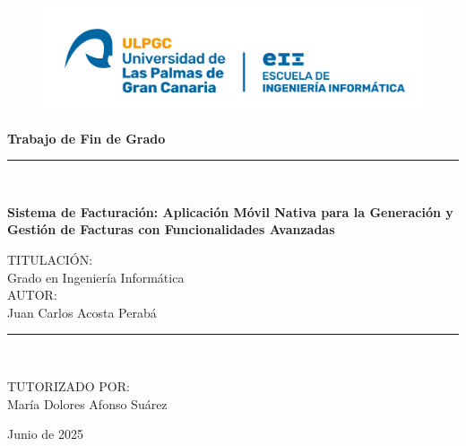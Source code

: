 \begin{titlepage}

\begin{center}

\vspace*{0.25in}
\begin{figure}[htb]
\begin{center}
\includegraphics[width=15cm]{Ilustraciones/NuevoLogoEII.png}
\end{center}
\end{figure}

\vspace*{0.25in}
\vspace*{0.25in}
\begin{Huge}
    \textbf{Trabajo de Fin de Grado} \\
\end{Huge}
\vspace*{0.5in}

\noindent\hfil\rule{17cm}{0.2mm}\hfil\\

\vspace*{0.1in}
\begin{Huge}
    \textbf{Sistema de Facturación: Aplicación Móvil Nativa para la Generación y Gestión de Facturas con Funcionalidades Avanzadas} \\
\end{Huge}
\vspace*{0.3in}
\begin{large}
TITULACIÓN: \\
Grado en Ingeniería Informática \\
\vspace*{0.1in}
AUTOR: \\
Juan Carlos Acosta Perabá \\
\end{large}
\vspace*{0.3in}
\noindent\hfil\rule{17cm}{0.2mm}\hfil\\
\vspace*{0.1in}
\begin{large}
TUTORIZADO POR: \\
María Dolores Afonso Suárez \\
\end{large}
\vspace*{0.3in}
Junio de 2025

\end{center}


\end{titlepage}
